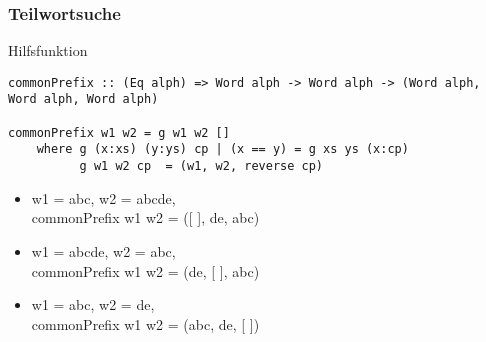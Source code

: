 \documentclass{beamer}
\begin{document}
\begin{frame}[fragile]
\frametitle{Teilwortsuche}
Hilfsfunktion
\begin{lstlisting}
commonPrefix :: (Eq alph) => Word alph -> Word alph -> (Word alph, Word alph, Word alph)

commonPrefix w1 w2 = g w1 w2 []
    where g (x:xs) (y:ys) cp | (x == y) = g xs ys (x:cp)
          g w1 w2 cp  = (w1, w2, reverse cp)
\end{lstlisting}
\begin{example}
\begin{itemize}
    \item w1 = abc, w2 = abcde, \\commonPrefix w1 w2 = ([ ], de, abc)
    \item w1 = abcde, w2 = abc, \\commonPrefix w1 w2 = (de, [ ], abc)
    \item w1 = abc, w2 = de, \\commonPrefix w1 w2 = (abc, de, [ ])
\end{itemize}
\end{example}
\end{frame}
\end{document}
